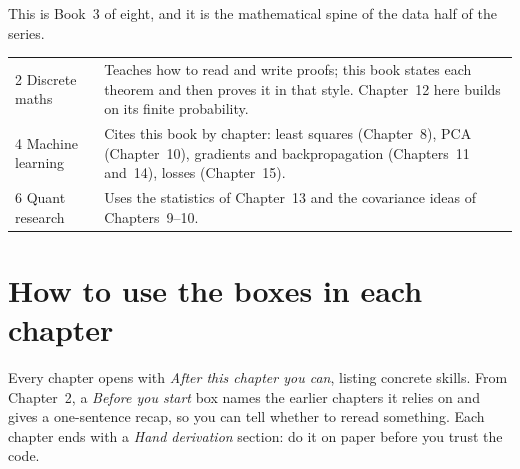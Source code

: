 This is Book~3 of eight, and it is the mathematical spine of the data half of the
series.

\begin{center}
\begin{tabular}{P{2.4cm}P{9.0cm}}
\toprule
{} & \\
 Discrete maths & Teaches how to read and write proofs; this book states each theorem and then proves it in that style. Chapter~12 here builds on its finite probability.\\
4 Machine learning & Cites this book by chapter: least squares (Chapter~8), PCA (Chapter~10), gradients and backpropagation (Chapters~11 and~14), losses (Chapter~15).\\
6 Quant research & Uses the statistics of Chapter~13 and the covariance ideas of Chapters~9--10.\\
\bottomrule
\end{tabular}
\end{center}

\section*{How to use the boxes in each chapter}

Every chapter opens with \emph{After this chapter you can}, listing concrete
skills. From Chapter~2, a \emph{Before you start} box names the earlier
chapters it relies on and gives a one-sentence recap, so you can tell whether to
reread something. Each chapter ends with a \emph{Hand derivation} section: do it
on paper before you trust the code.
